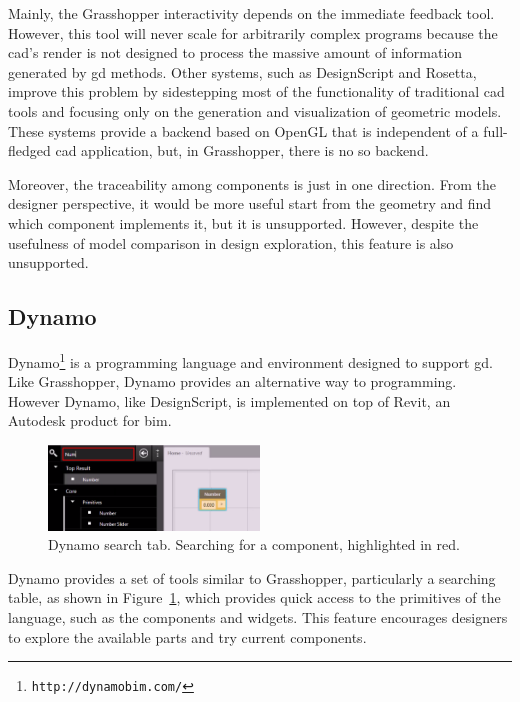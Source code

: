 Mainly, the Grasshopper interactivity depends on the immediate feedback tool. However, this tool will never scale for arbitrarily complex programs because the \gls{cad}'s render is not designed to process the massive amount of information generated by \gls{gd} methods. Other systems, such as DesignScript and Rosetta, improve this problem by sidestepping most of the functionality of traditional \gls{cad} tools and focusing only on the generation and visualization of geometric models. These systems provide a backend based on OpenGL that is independent of a full-fledged \gls{cad} application, but, in Grasshopper, there is no so backend.

Moreover, the traceability among components is just in one direction. From the designer perspective, it would be more useful start from the geometry and find which component implements it, but it is unsupported. However, despite the usefulness of model comparison in design exploration, this feature is also unsupported.
\subsection{Dynamo}
\label{subsed:dynamo}
Dynamo\footnote{\texttt{http://dynamobim.com/}} is a programming language and environment designed to support \gls{gd}. Like Grasshopper, Dynamo provides an alternative way to programming. However Dynamo, like DesignScript, is implemented on top of Revit, an Autodesk product for \gls{bim}.

\begin{figure}
  \begin{center}
    \includegraphics[width=0.5\textwidth]{images/dynam-tab}
  \end{center}
 \caption{Dynamo search tab. Searching for a component, highlighted in red.}  
    \label{fig:dynam}
\end{figure}

Dynamo provides a set of tools similar to Grasshopper, particularly a searching table, as shown in Figure~\ref{fig:dynam}, which provides quick access to the primitives of the language, such as the components and widgets. This feature encourages designers to explore the available parts and try current components.

